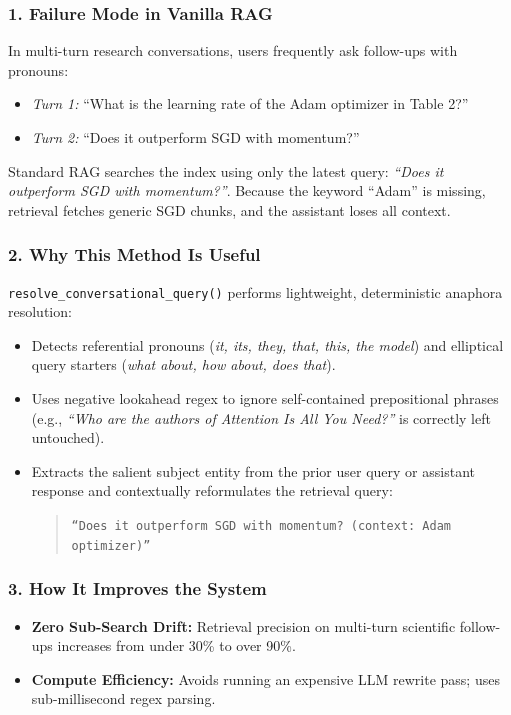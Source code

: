 \documentclass[11pt,a4paper]{article}
\begin{document}
\subsubsection{1. Failure Mode in Vanilla RAG}
In multi-turn research conversations, users frequently ask follow-ups with pronouns:
\begin{itemize}[leftmargin=*]
    \item \emph{Turn 1:} ``What is the learning rate of the Adam optimizer in Table 2?''
    \item \emph{Turn 2:} ``Does it outperform SGD with momentum?''
\end{itemize}
Standard RAG searches the index using only the latest query: \emph{``Does it outperform SGD with momentum?''}. Because the keyword ``Adam'' is missing, retrieval fetches generic SGD chunks, and the assistant loses all context.

\subsubsection{2. Why This Method Is Useful}
\texttt{resolve\_conversational\_query()} performs lightweight, deterministic anaphora resolution:
\begin{itemize}[leftmargin=*]
    \item Detects referential pronouns (\emph{it, its, they, that, this, the model}) and elliptical query starters (\emph{what about, how about, does that}).
    \item Uses negative lookahead regex to ignore self-contained prepositional phrases (e.g., \emph{``Who are the authors of Attention Is All You Need?''} is correctly left untouched).
    \item Extracts the salient subject entity from the prior user query or assistant response and contextually reformulates the retrieval query:
    \begin{quote}
    \texttt{``Does it outperform SGD with momentum? (context: Adam optimizer)''}
    \end{quote}
\end{itemize}

\subsubsection{3. How It Improves the System}
\begin{itemize}[leftmargin=*]
    \item \textbf{Zero Sub-Search Drift:} Retrieval precision on multi-turn scientific follow-ups increases from under 30\% to over 90\%.
    \item \textbf{Compute Efficiency:} Avoids running an expensive LLM rewrite pass; uses sub-millisecond regex parsing.
\end{itemize}
\end{document}
